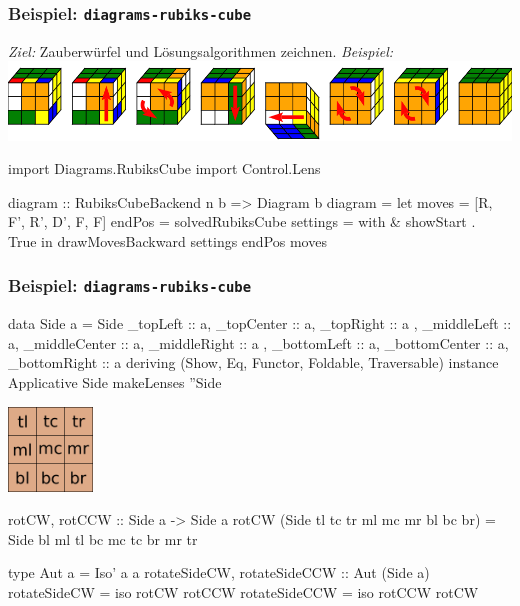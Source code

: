 \documentclass{beamer}
\begin{document}
\begin{frame}[fragile]
  \frametitle{Beispiel: \texttt{diagrams-rubiks-cube}}
  \emph{Ziel:} Zauberwürfel und Lösungsalgorithmen zeichnen. \emph{Beispiel:}\\[1em]
  \includegraphics[width=0.65\linewidth]{images/rubiks-sequence.png}\\
  \begin{haskellcode}
import Diagrams.RubiksCube
import Control.Lens

diagram :: RubiksCubeBackend n b => Diagram b
diagram =
  let moves    = [R, F', R', D', F, F]
      endPos   = solvedRubiksCube
      settings = with & showStart .~ True
  in drawMovesBackward settings endPos moves
  \end{haskellcode}
\end{frame}

\begin{frame}[fragile]
  \frametitle{Beispiel: \texttt{diagrams-rubiks-cube}}

  \begin{haskellcode}
data Side a = Side
  {    _topLeft :: a,    _topCenter :: a,    _topRight :: a
  , _middleLeft :: a, _middleCenter :: a, _middleRight :: a
  , _bottomLeft :: a, _bottomCenter :: a, _bottomRight :: a
  } deriving (Show, Eq, Functor, Foldable, Traversable)
instance Applicative Side
makeLenses ''Side
  \end{haskellcode}
  \vspace{0.5em}
  \begin{minipage}{0.22 \linewidth}
    \includegraphics[width=2.25cm]{images/side.png}
  \end{minipage}
  \begin{minipage}{0.75 \linewidth}
    \begin{haskellcode}
rotCW, rotCCW :: Side a -> Side a
rotCW (Side tl tc tr ml mc mr bl bc br) =
       Side bl ml tl bc mc tc br mr tr

type Aut a = Iso' a a
rotateSideCW, rotateSideCCW :: Aut (Side a)
rotateSideCW  = iso rotCW  rotCCW
rotateSideCCW = iso rotCCW rotCW
    \end{haskellcode}
  \end{minipage}
\end{frame}
\end{document}
